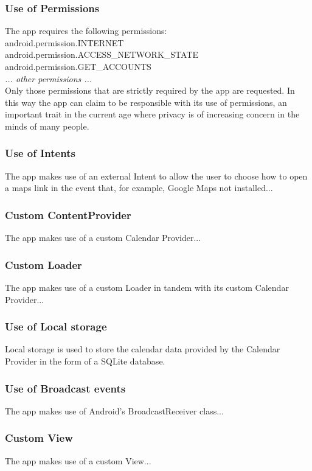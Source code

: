 \documentclass{article}
\begin{document}
\subsubsection{Use of Permissions}
The app requires the following permissions:\\
    \newline
    \indent android.permission.INTERNET\\
    \indent android.permission.ACCESS\_NETWORK\_STATE\\
    \indent android.permission.GET\_ACCOUNTS\\
    \indent \emph{... other permissions ...}\\
    \newline
Only those permissions that are strictly required by the app are requested. In this way the app can claim to be responsible with its use of permissions, an important trait in the current age where privacy is of increasing concern in the minds of many people. 

\subsubsection{Use of Intents}
The app makes use of an external Intent to allow the user to choose how to open a maps link in the event that, for example, Google Maps not installed...
\subsubsection{Custom ContentProvider}
The app makes use of a custom Calendar Provider...
\subsubsection{Custom Loader}
The app makes use of a custom Loader in tandem with its custom Calendar Provider...
\subsubsection{Use of Local storage}
Local storage is used to store the calendar data provided by the Calendar Provider in the form of a SQLite database.
\subsubsection{Use of Broadcast events}
The app makes use of Android's BroadcastReceiver class...
\subsubsection{Custom View}
The app makes use of a custom View...
\end{document}
